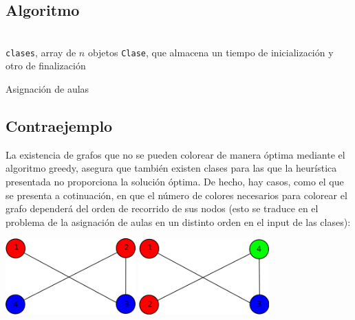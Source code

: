 \documentclass[a4paper, 11pt]{article} %
\let\emptyset\varnothing
\begin{document}
  \subsection{Algoritmo}
\begin{algorithm}[H]
	\begin{algorithmic}[1]
		\REQUIRE \ \\
        	\texttt{clases}, array de $n$ objetos \texttt{Clase}, que almacena
				 un tiempo de inicialización y otro de 
				 finalización\\
	  \WHILE{\texttt{sin\_colorear}$\neq \emptyset$}
	      \ENDIF
	    \ENDFOR
	  \ENDWHILE
	\end{algorithmic}
    \caption{Asignación de aulas}
    \label{aulas}
\end{algorithm}


\subsection{Contraejemplo}
La existencia de grafos que no se pueden colorear de manera óptima mediante el algoritmo greedy, asegura que también existen clases para
las que la heurística presentada no proporciona la solución óptima. De hecho, hay casos, como el que se presenta a cotinuación,
en que el número de colores necesarios para colorear el grafo dependerá del orden de recorrido de sus nodos (esto se traduce en
el problema de la asignación de aulas en un distinto orden en el input de las clases):

     \begin{center}
	\includegraphics[width=5cm]{ej51.png}
	\includegraphics[width=5cm]{ej52.png}
     \end{center}  
     
\end{document}
